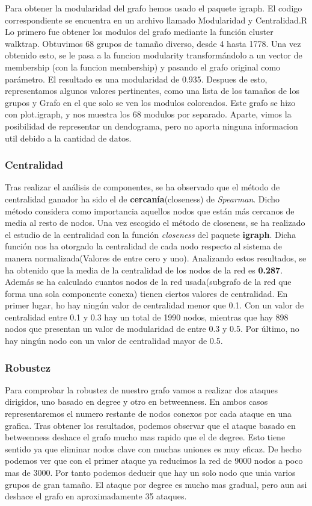 Para obtener la modularidad del grafo hemos usado el paquete igraph. El codigo correspondiente se encuentra en un archivo llamado Modularidad y Centralidad.R
Lo primero fue obtener los modulos del grafo mediante la función cluster walktrap. Obtuvimos 68 grupos de tamaño diverso, desde 4 hasta 1778. Una vez obtenido esto, se le pasa a la funcion modularity transformándolo a un vector de membership (con la funcion membership) y pasando el grafo original como parámetro. El resultado es una modularidad de 0.935.
Despues de esto, representamos algunos valores pertinentes, como una lista de los tamaños de los grupos y Grafo en el que solo se ven los modulos coloreados.
Este grafo se hizo con plot.igraph, y nos muestra los 68 modulos por separado.
Aparte, vimos la posibilidad de representar un dendograma, pero no aporta ninguna informacion util debido a la cantidad de datos.


\subsubsection{Centralidad}

Tras realizar el an\'alisis de componentes, se ha observado que el m\'etodo de centralidad ganador ha sido el de \textbf{cercan\'ia}(closeness) de \textit{Spearman}. Dicho método considera como importancia aquellos nodos que están más cercanos de media al resto de nodos.
Una vez escogido el m\'etodo de closeness, se ha realizado el estudio de la centralidad con la funci\'on \textit{closeness} del paquete \textbf{igraph}. Dicha funci\'on nos ha otorgado la centralidad de cada nodo respecto al sistema de manera normalizada(Valores de entre cero y uno).
Analizando estos resultados, se ha obtenido que la media de la centralidad de los nodos de la red es \textbf{0.287}.
Adem\'as se ha calculado cuantos nodos de la red usada(subgrafo de la red que forma una sola componente conexa) tienen ciertos valores de centralidad.
En primer lugar, ho hay ningún valor de centralidad menor que 0.1. Con un valor de centralidad entre 0.1 y 0.3 hay un total de 1990 nodos, mientras que hay 898 nodos que presentan un valor de modularidad de entre 0.3 y 0.5. Por último, no hay ningún nodo con un valor de centralidad mayor de 0.5.


\subsubsection{Robustez}

Para comprobar la robustez de nuestro grafo vamos a realizar dos ataques dirigidos, uno basado en degree y otro en betweenness. En ambos casos representaremos el numero restante de nodos conexos por cada ataque en una grafica. Tras obtener los resultados, podemos observar que el ataque basado en betweenness deshace el grafo mucho mas rapido que el de degree. Esto tiene sentido ya que eliminar nodos clave con muchas uniones es muy eficaz. De hecho podemos ver que con el primer ataque ya reducimos la red de 9000 nodos a poco mas de 3000. Por tanto podemos deducir que hay un solo nodo que unia varios grupos de gran tamaño.
El ataque por degree es mucho mas gradual, pero aun asi deshace el grafo en aproximadamente 35 ataques.

